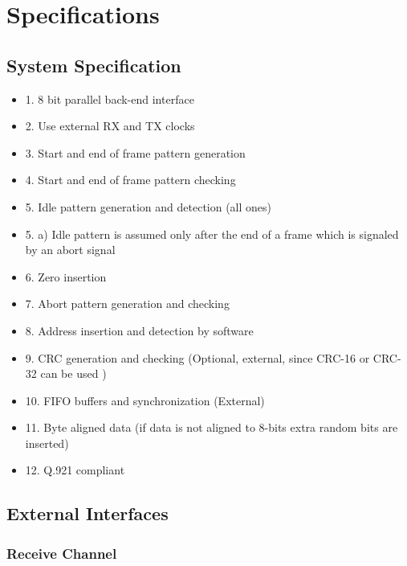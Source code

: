 \documentclass[a4paper,11pt]{article}
\begin{document}
\section{Specifications}

\subsection{System Specification}
\begin{itemize}
\item 1. 8 bit parallel back-end interface
\item 2. Use external RX and TX clocks
\item 3. Start and end of frame pattern generation
\item 4. Start and end of frame pattern checking
\item 5. Idle pattern generation and detection (all ones)
\item 5. a)  Idle pattern is assumed only after the end of a frame which is signaled by an abort signal
\item 6. Zero insertion
\item 7. Abort pattern generation and checking
\item 8. Address insertion and detection by software
\item 9. CRC generation and checking (Optional, external, since CRC-16 or CRC-32 can be used )
\item 10. FIFO buffers and synchronization (External)
\item 11. Byte aligned data (if data is not aligned to 8-bits extra random bits are inserted)
\item 12. Q.921 compliant
\end{itemize}

\subsection{External Interfaces}

\subsubsection{Receive Channel}
\end{document}
